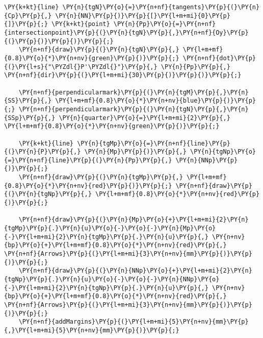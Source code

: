 \begin{Verbatim}[commandchars=\\\{\}]
    \PY{k+kt}{line} \PY{n}{tgN}\PY{o}{=}\PY{n+nf}{tangents}\PY{p}{(}\PY{n}{Cp}\PY{p}{,} \PY{n}{NN}\PY{p}{)}\PY{p}{[}\PY{l+m+mi}{0}\PY{p}{]}\PY{p}{;} \PY{k+kt}{point} \PY{n}{Pp}\PY{o}{=}\PY{n+nf}{intersectionpoint}\PY{p}{(}\PY{n}{tgN}\PY{p}{,}\PY{n+nf}{Oy}\PY{p}{(}\PY{p}{)}\PY{p}{)}\PY{p}{;}
    \PY{n+nf}{draw}\PY{p}{(}\PY{n}{tgN}\PY{p}{,} \PY{l+m+mf}{0.8}\PY{o}{*}\PY{n+nv}{green}\PY{p}{)}\PY{p}{;} \PY{n+nf}{dot}\PY{p}{(}\PY{l+s}{"\PYZdl{}P'\PYZdl{}"}\PY{p}{,} \PY{n}{Pp}\PY{p}{,} \PY{n+nf}{dir}\PY{p}{(}\PY{l+m+mi}{30}\PY{p}{)}\PY{p}{)}\PY{p}{;}

    \PY{n+nf}{perpendicularmark}\PY{p}{(}\PY{n}{tgM}\PY{p}{,}\PY{n}{SS}\PY{p}{,} \PY{l+m+mf}{0.8}\PY{o}{*}\PY{n+nv}{blue}\PY{p}{)}\PY{p}{;} \PY{n+nf}{perpendicularmark}\PY{p}{(}\PY{n}{tgN}\PY{p}{,}\PY{n}{SSp}\PY{p}{,} \PY{n}{quarter}\PY{o}{=}\PY{l+m+mi}{2}\PY{p}{,} \PY{l+m+mf}{0.8}\PY{o}{*}\PY{n+nv}{green}\PY{p}{)}\PY{p}{;}

    \PY{k+kt}{line} \PY{n}{tgMp}\PY{o}{=}\PY{n+nf}{line}\PY{p}{(}\PY{n}{P}\PY{p}{,} \PY{n}{Mp}\PY{p}{)}\PY{p}{,} \PY{n}{tgNp}\PY{o}{=}\PY{n+nf}{line}\PY{p}{(}\PY{n}{Pp}\PY{p}{,} \PY{n}{NNp}\PY{p}{)}\PY{p}{;}
    \PY{n+nf}{draw}\PY{p}{(}\PY{n}{tgMp}\PY{p}{,} \PY{l+m+mf}{0.8}\PY{o}{*}\PY{n+nv}{red}\PY{p}{)}\PY{p}{;} \PY{n+nf}{draw}\PY{p}{(}\PY{n}{tgNp}\PY{p}{,} \PY{l+m+mf}{0.8}\PY{o}{*}\PY{n+nv}{red}\PY{p}{)}\PY{p}{;}

    \PY{n+nf}{draw}\PY{p}{(}\PY{n}{Mp}\PY{o}{+}\PY{l+m+mi}{2}\PY{n}{tgMp}\PY{p}{.}\PY{n}{u}\PY{o}{-}\PY{o}{-}\PY{n}{Mp}\PY{o}{-}\PY{l+m+mi}{2}\PY{n}{tgMp}\PY{p}{.}\PY{n}{u}\PY{p}{,} \PY{n+nv}{bp}\PY{o}{+}\PY{l+m+mf}{0.8}\PY{o}{*}\PY{n+nv}{red}\PY{p}{,} \PY{n+nf}{Arrows}\PY{p}{(}\PY{l+m+mi}{3}\PY{n+nv}{mm}\PY{p}{)}\PY{p}{)}\PY{p}{;}
    \PY{n+nf}{draw}\PY{p}{(}\PY{n}{NNp}\PY{o}{+}\PY{l+m+mi}{2}\PY{n}{tgNp}\PY{p}{.}\PY{n}{u}\PY{o}{-}\PY{o}{-}\PY{n}{NNp}\PY{o}{-}\PY{l+m+mi}{2}\PY{n}{tgNp}\PY{p}{.}\PY{n}{u}\PY{p}{,} \PY{n+nv}{bp}\PY{o}{+}\PY{l+m+mf}{0.8}\PY{o}{*}\PY{n+nv}{red}\PY{p}{,} \PY{n+nf}{Arrows}\PY{p}{(}\PY{l+m+mi}{3}\PY{n+nv}{mm}\PY{p}{)}\PY{p}{)}\PY{p}{;}
    \PY{n+nf}{addMargins}\PY{p}{(}\PY{l+m+mi}{5}\PY{n+nv}{mm}\PY{p}{,}\PY{l+m+mi}{5}\PY{n+nv}{mm}\PY{p}{)}\PY{p}{;}
\end{Verbatim}
